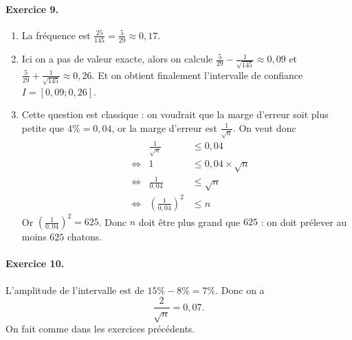 \documentclass[11pt]{article}
\begin{document}
\paragraph{Exercice 9.}
\begin{enumerate}
  \item La fréquence est $\frac{25}{145}=\frac{5}{29}\approx0,17$.
  \item Ici on a pas de valeur exacte, alors on calcule
    $\frac{5}{29}-\frac{1}{\sqrt{145}}\approx0,09$ et
    $\frac{5}{29}+\frac{1}{\sqrt{145}}\approx0,26$. Et on obtient finalement l'intervalle de
    confiance $I=\left[ 0,09;0,26 \right]$.
  \item Cette question est classique : on voudrait que la
    marge d'erreur soit plus petite que $4\%=0,04$, or la marge d'erreur est
    $\frac{1}{\sqrt n}$. On veut donc
    \begin{align*}
     & & \frac{1}{\sqrt n} &\leq 0,04 \\
     &\Leftrightarrow& 1 &\leq 0,04\times\sqrt n \\
     &\Leftrightarrow& \frac{1}{0,04} &\leq \sqrt n \\
     &\Leftrightarrow& \left(\frac{1}{0,04}\right)^2 &\leq n
    \end{align*}
    Or $\left( \frac{1}{0,04} \right)^2=625$. Donc $n$ doit être plus grand que
    $625$ : on doit prélever au moins $625$ chatons.
\end{enumerate}

\paragraph{Exercice 10.} L'amplitude de l'intervalle est de $15\%-8\%=7\%$. Donc on
a 
\[
  \frac{2}{\sqrt n} = 0,07.
\]
On fait comme dans les exercices précédents.
\end{document}
